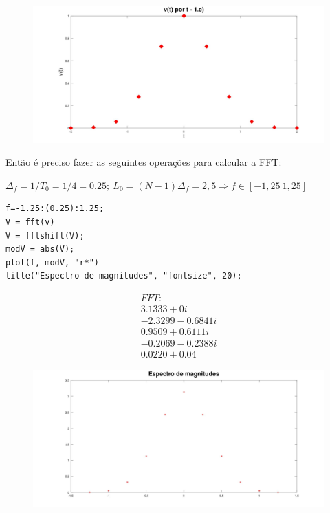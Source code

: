\documentclass[10pt]{article}
\begin{document}
\begin{figure}[h]
    \includegraphics[scale=0.2]{questao1c}
    \centering
\end{figure}

Então é preciso fazer as seguintes operações para calcular a FFT:

$\Delta_f = 1/T_0 = 1/4 = 0.25; \ L_0 = (N - 1)\Delta_f = 2,5 \Rightarrow f \in [-1,25 \ 1,25]$

\begin{verbatim}
f=-1.25:(0.25):1.25;
V = fft(v)
V = fftshift(V);
modV = abs(V);
plot(f, modV, "r*")
title("Espectro de magnitudes", "fontsize", 20);
\end{verbatim}

\begin{align*}
    FFT: \\
    3.1333 +      0i \\
    -2.3299 - 0.6841i \\
    0.9509 + 0.6111i \\
    -0.2069 - 0.2388i \\
    0.0220 + 0.04
\end{align*}

\begin{figure}[h]
    \includegraphics[scale=0.2]{questao1c2}
    \centering
\end{figure}
\end{document}
